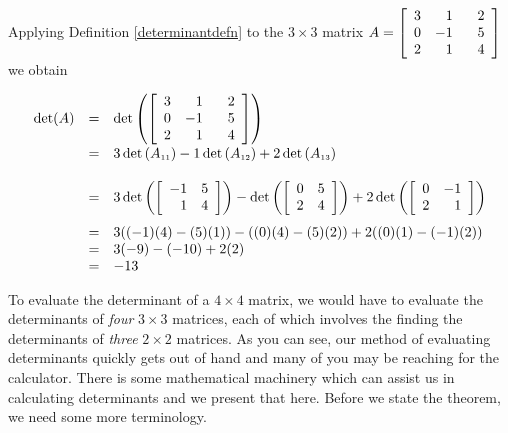 Applying Definition \ref{determinantdefn} to the $3 \times 3$ matrix $A =  \left[ \begin{array}{rrr} 3 & 1 & \hphantom{-}2 \\ 0 & -1 & 5 \\ 2 & 1 & 4 \\ \end{array} \right]$ we obtain

\[ \begin{array}{rcl} 

\det(A) & = & \det \left( \left[ \begin{array}{rrr} 3 & 1 & \hphantom{-}2 \\ 0 & -1 & 5 \\ 2 & 1 & 4 \\ \end{array} \right] \right)\\[13pt]
        & = & 3\det\left(A_{\mbox{\tiny$11$}}\right) - 1\det\left(A_{\mbox{\tiny$12$}}\right) + 2\det\left(A_{\mbox{\tiny$13$}}\right) \\[13pt]
        & = & 3\det \left( \left[ \begin{array}{rr} -1 & 5 \\ 1 & 4 \\ \end{array} \right] \right) - \det \left( \left[ \begin{array}{rr} 0 & 5 \\ 2 & 4 \\ \end{array} \right] \right) + 2 \det \left( \left[ \begin{array}{rr} 0 & -1 \\ 2 & 1 \\ \end{array} \right] \right) \\[13pt]
        & = & 3((-1)(4) - (5)(1)) - ((0)(4)-(5)(2))+2((0)(1)-(-1)(2)) \\
        & = & 3(-9)-(-10)+2(2) \\
        & = & -13 \\ \end{array}  \]

To evaluate the determinant of a $4 \times 4$ matrix, we would have to evaluate the determinants of \textit{four} $3 \times 3$ matrices, each of which involves the finding the determinants of \textit{three} $2 \times 2$ matrices. As you can see, our method of evaluating determinants quickly gets out of hand and many of you may be reaching for the calculator.  There is some mathematical machinery which can assist us in calculating determinants and we present that here.  Before we state the theorem, we need some more terminology.

